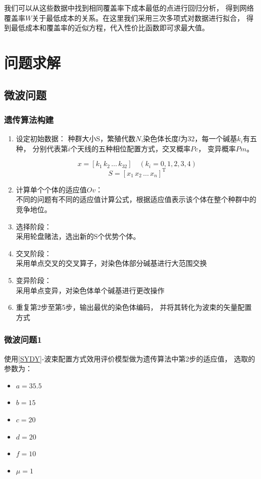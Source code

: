 \documentclass[UTF8,12pt]{ctexart}
\begin{document}
我们可以从这些数据中找到相同覆盖率下成本最低的点进行回归分析，
得到网络覆盖率$W$关于最低成本的关系。在这里我们采用三次多项式对数据进行拟合，
得到最低成本和覆盖率的近似方程，代入性价比函数即可求最大值。





\section{问题求解}

\subsection{微波问题}

\subsubsection{遗传算法构建}
\begin{enumerate}
    \item 设定初始数据：
          种群大小S，繁殖代数$N$,染色体长度$l$为32，每一个碱基$k_i$有五种，
          分别代表第$i$个天线的五种相位配置方式，交叉概率$Pc$，
          变异概率$Pm$。
          \begin{large}
              $$x = \left[ k_1 \, k_2 \, \ldots \, k_{32}\right]
                  \quad (k_i =  0,1,2,3,4)$$
              $$S = \left[x_1 \, x _2 \,  \ldots \,  x_{n}\right]^{\text{T}}$$

          \end{large}
    \item 计算单个个体的适应值$Ov$：\\
          不同的问题有不同的适应值计算公式，根据适应值表示该个体在整个种群中的竞争地位。
    \item 选择阶段：\\
          采用轮盘赌法，选出新的S个优势个体。
    \item 交叉阶段：\\
          采用单点交叉的交叉算子，对染色体部分碱基进行大范围交换
    \item 变异阶段：\\
          采用单点变异，对染色体单个碱基进行更改操作
    \item 重复第2步至第5步，输出最优的染色体编码，
          并将其转化为波束的矢量配置方式
\end{enumerate}

\subsubsection{微波问题1}
使用\ref{SYDY}-波束配置方式效用评价模型做为遗传算法中第2步的适应值，
选取的参数为：
\begin{itemize}
    \item $a=35.5$
    \item $b=15$
    \item $c=20$
    \item $d=20$
    \item $f=10$
    \item $μ = 1$
\end{itemize}
\end{document}
